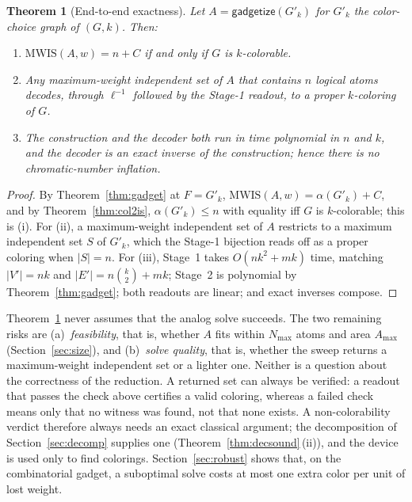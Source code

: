 \documentclass[a4paper,fleqn]{cas-sc}
\newtheorem{theorem}{Theorem}[section]
\newcommand{\MWIS}{\mathrm{MWIS}}
\newcommand{\indep}{\alpha}
\begin{document}
\begin{theorem}[End-to-end exactness]
\label{thm:endtoend}
Let $A=\mathsf{gadgetize}(G'_k)$ for $G'_k$ the color-choice graph of $(G,k)$. Then:
\begin{enumerate}[label=(\roman*),leftmargin=2.2em]
  \item $\MWIS(A,w) = n + C$ if and only if $G$ is $k$-colorable.
  \item Any maximum-weight independent set of $A$ that contains $n$ logical atoms
        decodes, through $\ell^{-1}$ followed by the Stage-1 readout, to a proper
        $k$-coloring of $G$.
  \item The construction and the decoder both run in time polynomial in $n$ and
        $k$, and the decoder is an exact inverse of the construction; hence there
        is no chromatic-number inflation.
\end{enumerate}
\end{theorem}

\begin{proof}
By Theorem~\ref{thm:gadget} at $F=G'_k$, $\MWIS(A,w)=\indep(G'_k)+C$, and by
Theorem~\ref{thm:col2is}, $\indep(G'_k)\le n$ with equality iff $G$ is $k$-colorable;
this is (i). For (ii), a maximum-weight independent set of $A$ restricts to a maximum
independent set $S$ of $G'_k$, which the Stage-1 bijection reads off as a proper
coloring when $|S|=n$. For (iii), Stage~1 takes $O(nk^2+mk)$ time, matching
$|V'|=nk$ and $|E'|=n\binom{k}{2}+mk$; Stage~2 is polynomial by
Theorem~\ref{thm:gadget}; both readouts are linear; and exact inverses compose.
\end{proof}

\begin{remark}
\label{rem:uncertainty}
Theorem~\ref{thm:endtoend} never assumes that the analog solve succeeds. The two
remaining risks are (a)~\emph{feasibility}, that is, whether $A$ fits within
$N_{\max}$ atoms and area $A_{\max}$ (Section~\ref{sec:size}), and (b)~\emph{solve
quality}, that is, whether the sweep returns a maximum-weight independent set or a
lighter one. Neither is a question about the correctness of the reduction. A returned
set can always be verified: a readout that passes the check above certifies a valid
coloring, whereas a failed check means only that no witness was found, not that none
exists. A non-colorability verdict therefore always needs an exact classical argument;
the decomposition of Section~\ref{sec:decomp} supplies one
(Theorem~\ref{thm:decsound}\,(ii)), and the device is used only to find colorings.
Section~\ref{sec:robust} shows that, on the combinatorial gadget, a suboptimal solve
costs at most one extra color per unit of lost weight.
\end{remark}
\end{document}
